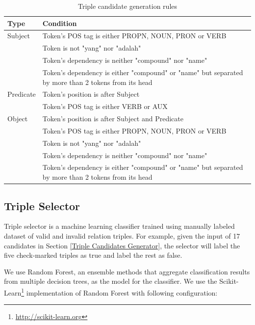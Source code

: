 \documentclass[conference,compsoc]{IEEEtran}
\begin{document}
\begin{table}[!t]
\renewcommand{\arraystretch}{1.5}
\caption{Triple candidate generation rules}
\label{table_triple_candidate_generation_rules}
\centering
\begin{tabular}{l|p{6cm}}
\hline
\textbf{Type} & \textbf{Condition} \\
\hline
Subject & Token's POS tag is either PROPN, NOUN, PRON or VERB \\
\space & Token is not "yang" nor "adalah" \\
\space & Token's dependency is neither "compound" nor "name" \\
\space & Token's dependency is either "compound" or "name" but separated by more than 2 tokens from its head \\
\hline
Predicate & Token's position is after Subject \\
\space & Token's POS tag is either VERB or AUX \\
\hline
Object & Token's position is after Subject and Predicate \\
\space & Token's POS tag is either PROPN, NOUN, PRON or VERB \\
\space & Token is not "yang" nor "adalah" \\
\space & Token's dependency is neither "compound" nor "name" \\
\space & Token's dependency is either "compound" or "name" but separated by more than 2 tokens from its head \\
\end{tabular}
\end{table}


\subsection{Triple Selector}

Triple selector is a machine learning classifier trained using manually labeled dataset of valid and invalid relation triples. For example, given the input of 17 candidates in Section \ref{Triple Candidates Generator}, the selector will label the five check-marked triples as true and label the rest as false.

We use Random Forest\cite{breiman2001random}, an ensemble methods that aggregate classification results from multiple decision trees, as the model for the classifier. We use the Scikit-Learn\footnote{\url{http://scikit-learn.org}} implementation of Random Forest with following configuration:
\end{document}
